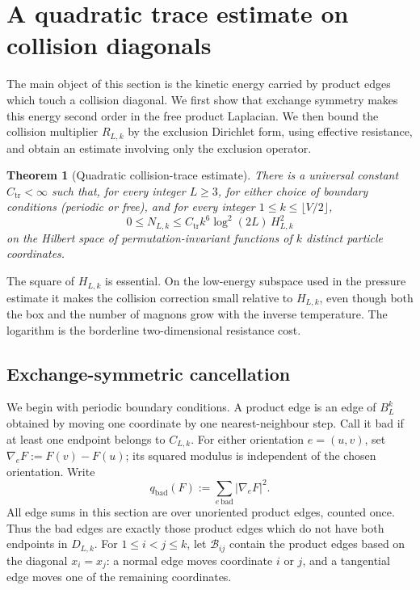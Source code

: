 \documentclass[11pt]{article}
\numberwithin{equation}{section}
\newtheorem{theorem}{Theorem}[section]
\theoremstyle{remark}
\newcommand{\1}{\mathbf 1}
\begin{document}
\section{A quadratic trace estimate on collision diagonals}
\label{sec:collision-trace}

The main object of this section is the kinetic energy carried by product
edges which touch a collision diagonal.  We first show that exchange
symmetry makes this energy second order in the free product Laplacian.  We
then bound the collision multiplier \(R_{L,k}\) by the exclusion Dirichlet
form, using effective resistance, and obtain an estimate involving only the
exclusion operator.

\begin{theorem}[Quadratic collision-trace estimate]
\label{thm:normal-trace}
There is a universal constant \(C_{\mathrm{tr}}<\infty\) such that, for
every integer \(L\geq3\), for either choice of boundary conditions
(periodic or free), and for every integer
\(1\leq k\leq\lfloor V/2\rfloor\),
\begin{equation}
 0\leq N_{L,k}\leq
 C_{\mathrm{tr}}k^6\log^2(2L)\,H_{L,k}^2
 \label{eq:intro-normal-trace}
\end{equation}
on the Hilbert space of permutation-invariant functions of \(k\) distinct
particle coordinates.
\end{theorem}

The square of \(H_{L,k}\) is essential.  On the low-energy subspace used
in the pressure estimate it makes the collision correction small relative
to \(H_{L,k}\), even though both the box and the number of magnons grow
with the inverse temperature.  The logarithm is the borderline
two-dimensional resistance cost.

\subsection{Exchange-symmetric cancellation}
\label{subsec:exchange-cancellation}

We begin with periodic boundary conditions.  A product edge is an edge of
\(B_L^k\) obtained by moving one coordinate by one nearest-neighbour step.
Call it bad if at least one endpoint belongs to \(C_{L,k}\).  For either
orientation \(e=(u,v)\), set \(\nabla_eF:=F(v)-F(u)\); its squared modulus
is independent of the chosen orientation.  Write
\begin{equation}
 q_{\mathrm{bad}}(F)
 :=\sum_{e\,\mathrm{bad}}|\nabla_eF|^2.
 \label{eq:bad-edge-form}
\end{equation}
All edge sums in this section are over unoriented product edges, counted
once.  Thus the bad edges are exactly those product edges which do not
have both endpoints in \(D_{L,k}\).
For \(1\leq i<j\leq k\), let \(\mathcal B_{ij}\) contain the product edges
based on the diagonal \(x_i=x_j\): a normal edge moves coordinate \(i\) or
\(j\), and a tangential edge moves one of the remaining coordinates.
\end{document}
